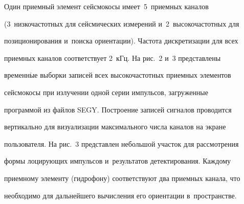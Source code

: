      Один приемный элемент сейсмокосы имеет~5~приемных каналов 

(3~низ\-ко\-час\-тот\-ных для сейсмических измерений и~2~высокочастотных для 

позиционирования и~поиска ориентации). Частота дискретизации для всех 

приемных каналов соответствует 2~кГц. На рис.~2 и~3 представлены 

временн$\acute{\mbox{ы}}$е выборки записей всех высокочастотных приемных элементов 

сейсмокосы при излучении одной серии импульсов, загруженные 

программой из файлов SEGY. Построение записей сигналов проводится 

вертикально для визуализации максимального числа каналов на экране 

пользователя. На рис.~3 представлен небольшой участок для рассмотрения 

формы лоцирующих импульсов и~результатов детектирования. Каждому 

приемному элементу (гидрофону) соответствуют два приемных канала, что 

необходимо для дальнейшего вычисления его ориентации в~пространстве.

     

